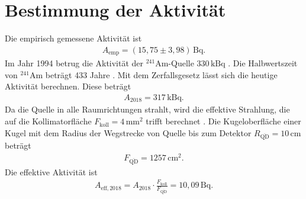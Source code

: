 \section{Bestimmung der Aktivität}
\label{6}

Die empirisch gemessene Aktivität ist
\begin{align*}
  A_{\text{emp}} = (15,75\pm3,98)\,\text{Bq}.
\end{align*}
Im Jahr 1994 betrug die Aktivität der $^{241}$Am-Quelle $330\,\text{kBq}$ \cite{skript}.
Die Halbwertszeit von $^{241}$Am beträgt 433 Jahre \cite{am}.
Mit dem Zerfallsgesetz lässt sich die heutige Aktivität berechnen.
Diese beträgt
\begin{align*}
  A_{2018} = 317\,\text{kBq}.
\end{align*}
Da die Quelle in alle Raumrichtungen strahlt, wird die effektive Strahlung, die auf die Kollimatorfläche $F_{\text{koll}} = 4\,\text{mm}^2$ trifft berechnet \cite{skript}.
Die Kugeloberfläche einer Kugel mit dem Radius der Wegstrecke von Quelle bis zum Detektor $R_{\overline{\text{QD}}} = 10\,\text{cm}$ beträgt
\begin{align*}
  F_{\overline{\text{QD}}} = 1257\,\text{cm}^2.
\end{align*}
Die effektive Aktivität ist
\begin{align*}
  A_{\text{eff},2018} = A_{2018}\cdot\frac{F_\text{koll}}{F_{\overline{\text{QD}}}} = 10,09\,\text{Bq}.
\end{align*}
